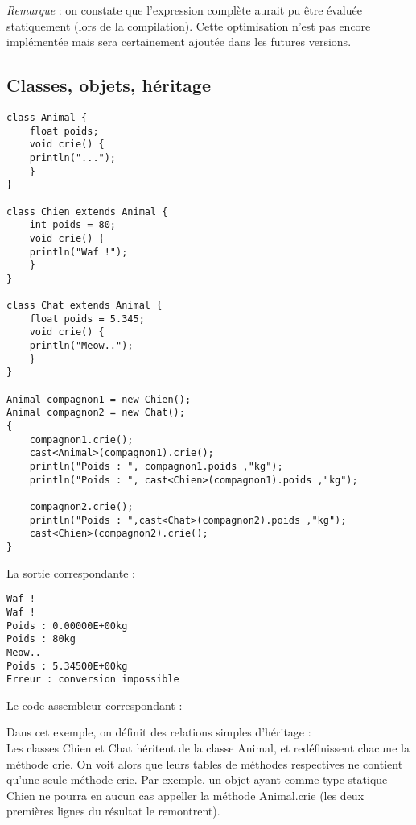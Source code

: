 \documentclass[11pt]{article}
\begin{document}
\emph{Remarque} : on constate que l'expression complète aurait pu être évaluée statiquement (lors de la compilation). Cette optimisation n'est pas encore implémentée mais sera certainement ajoutée dans les futures versions.


\newpage
\subsection{Classes, objets, héritage}
    \begin{lstlisting}
class Animal {
    float poids;
    void crie() {
	println("...");
    }
}

class Chien extends Animal {
    int poids = 80;
    void crie() {
	println("Waf !");
    }
}

class Chat extends Animal {
    float poids = 5.345;
    void crie() {
	println("Meow..");
    }
}

Animal compagnon1 = new Chien();
Animal compagnon2 = new Chat();
{
    compagnon1.crie();
    cast<Animal>(compagnon1).crie();
    println("Poids : ", compagnon1.poids ,"kg");
    println("Poids : ", cast<Chien>(compagnon1).poids ,"kg");
    
    compagnon2.crie();
    println("Poids : ",cast<Chat>(compagnon2).poids ,"kg");
    cast<Chien>(compagnon2).crie();
}
    \end{lstlisting}

La sortie correspondante :
\begin{verbatim}
Waf !
Waf !
Poids : 0.00000E+00kg
Poids : 80kg
Meow..
Poids : 5.34500E+00kg
Erreur : conversion impossible
\end{verbatim}

Le code assembleur correspondant :


\newpage

\hspace{1cm} Dans cet exemple, on définit des relations simples d'héritage : \\
Les classes Chien et Chat héritent de la classe Animal, et redéfinissent chacune la méthode crie. 
On voit alors que leurs tables de méthodes respectives ne contient qu'une seule méthode crie.
Par exemple, un objet ayant comme type statique Chien ne pourra en aucun cas appeller la méthode Animal.crie (les deux premières lignes du résultat le remontrent). \\
\end{document}
